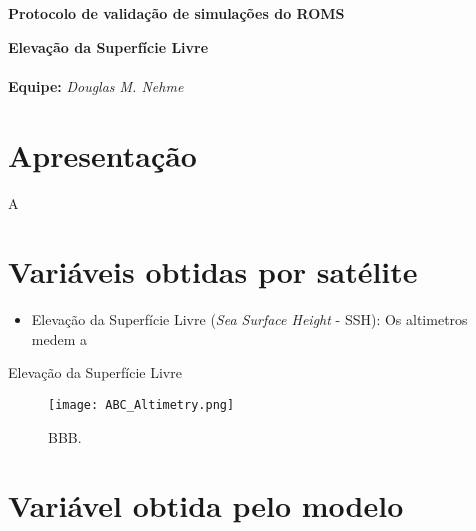 \documentclass[12pt]{article}
\begin{document}
\begin{center}
	{\bf {\Large Protocolo de validação de simulações do ROMS}}
	\vspace{5mm}\par

	{\bf {\large Elevação da Superfície Livre}}
	\\
	\hrulefill
	\\
	
	{\bf Equipe:} {\it Douglas M. Nehme}\\
	\par
\end{center}

\tableofcontents

\newpage

\section*{Apresentação}
	\par A
	
\section{Variáveis obtidas por satélite}

	\begin{itemize}
		\item Elevação da Superfície Livre (\textit{Sea Surface Height} - SSH): Os altimetros medem a 
	\end{itemize}Elevação da Superfície Livre

	\begin{figure}[h]
		\centering
		\texttt{[image: ABC\_Altimetry.png]}
   		\caption{BBB.
    	\label{fig:area_de_estudo_grade}}
	\end{figure}

\section{Variável obtida pelo modelo}
	


\end{document}
